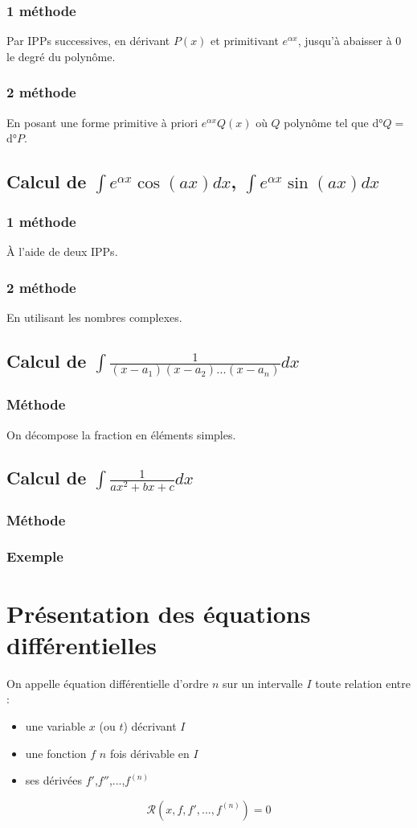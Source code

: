 \documentclass[12pt,a4paper,french]{book}
\begin{document}
			\subsubsection{1 méthode}
			Par IPPs successives, en dérivant $P(x)$ et primitivant $e^{\alpha x}$, jusqu'à abaisser à 0 le degré du polynôme.
			\subsubsection{2 méthode}
			En posant une forme primitive à priori $e^{\alpha x} Q(x)$ où $Q$ polynôme tel que d°$Q = $ d°$P$.
		\subsection{Calcul de $\int e^{\alpha x}\cos(ax)dx$, $\int e^{\alpha x}\sin(ax)dx$}
			\subsubsection{1 méthode}
			À l'aide de deux IPPs.
			\subsubsection{2 méthode}
			En utilisant les nombres complexes.
		\subsection{Calcul de $\int \frac{1}{(x-a_1)(x-a_2)\dots(x-a_n)}dx$}
			\subsubsection{Méthode}
			On décompose la fraction en éléments simples.
		\subsection{Calcul de $\int \frac{1}{ax^{2}+bx+c}dx$}
			\subsubsection{Méthode}
			\subsubsection{Exemple}
	\section{Présentation des équations différentielles}
	On appelle équation différentielle d'ordre $n$ sur un intervalle $I$ toute relation entre : \begin{itemize}
		\item une variable $x$ (ou $t$) décrivant $I$
		\item une fonction $f$ $n$ fois dérivable en $I$
		\item ses dérivées $f'$,$f''$,...,$f^{(n)}$
	\end{itemize}
	\[\mathcal{R}(x,f,f',...,f^{(n)}) = 0\]
	
\end{document}
